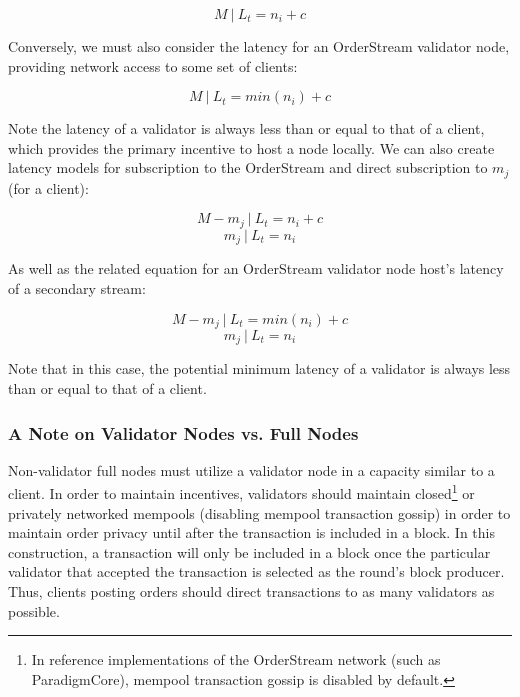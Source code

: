 \documentclass[9pt]{article}
\begin{document}
\begin{equation}
M\ |\ L_t = n_i + c
\end{equation}

\noindent Conversely, we must also consider the latency for an OrderStream validator node, providing network access to some set of clients:

\begin{equation}
M\ |\ L_t = min(n_i) + c
\end{equation} 

\noindent Note the latency of a validator is always less than or equal to that of a client, which provides the primary incentive to host a node locally. We can also create latency models for subscription to the OrderStream and direct subscription to $m_j$ (for a client):

\begin{equation}
M - m_j\ |\ L_t = n_i + c 
\end{equation}
\begin{equation}
m_j\ |\ L_t = n_i
\end{equation}

\noindent As well as the related equation for an OrderStream validator node host's latency of a secondary stream:

\begin{equation}
M - m_j\ |\ L_t = min(n_i) + c 
\end{equation}
\begin{equation}
m_j\ |\ L_t = n_i
\end{equation}

\noindent Note that in this case, the potential minimum latency of a validator is always less than or equal to that of a client.

\subsubsection{A Note on Validator Nodes vs. Full Nodes}

\noindent Non-validator full nodes must utilize a validator node in a capacity similar to a client. In order to maintain incentives, validators should maintain closed\footnote{In reference implementations of the OrderStream network (such as ParadigmCore), mempool transaction gossip is disabled by default.} or privately networked mempools (disabling mempool transaction gossip) in order to maintain order privacy until after the transaction is included in a block. In this construction, a transaction will only be included in a block once the particular validator that accepted the transaction is selected as the round’s block producer. Thus, clients posting orders should direct transactions to as many validators as possible.
\end{document}

